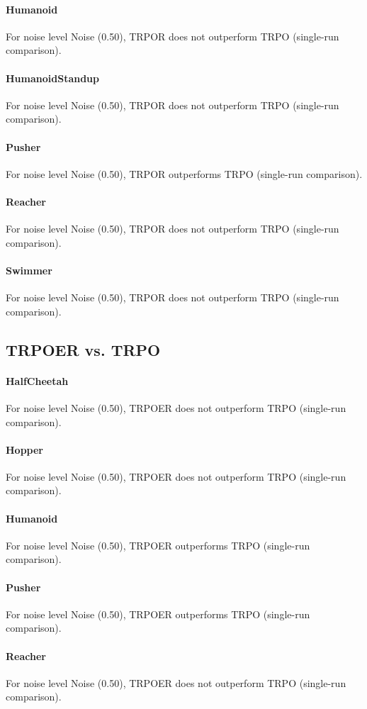 \paragraph{Humanoid}
For noise level Noise (0.50), TRPOR does not outperform TRPO (single-run comparison).
\paragraph{HumanoidStandup}
For noise level Noise (0.50), TRPOR does not outperform TRPO (single-run comparison).
\paragraph{Pusher}
For noise level Noise (0.50), TRPOR outperforms TRPO (single-run comparison).
\paragraph{Reacher}
For noise level Noise (0.50), TRPOR does not outperform TRPO (single-run comparison).
\paragraph{Swimmer}
For noise level Noise (0.50), TRPOR does not outperform TRPO (single-run comparison).
\subsection{TRPOER vs. TRPO}
\paragraph{HalfCheetah}
For noise level Noise (0.50), TRPOER does not outperform TRPO (single-run comparison).
\paragraph{Hopper}
For noise level Noise (0.50), TRPOER does not outperform TRPO (single-run comparison).
\paragraph{Humanoid}
For noise level Noise (0.50), TRPOER outperforms TRPO (single-run comparison).
\paragraph{Pusher}
For noise level Noise (0.50), TRPOER outperforms TRPO (single-run comparison).
\paragraph{Reacher}
For noise level Noise (0.50), TRPOER does not outperform TRPO (single-run comparison).
